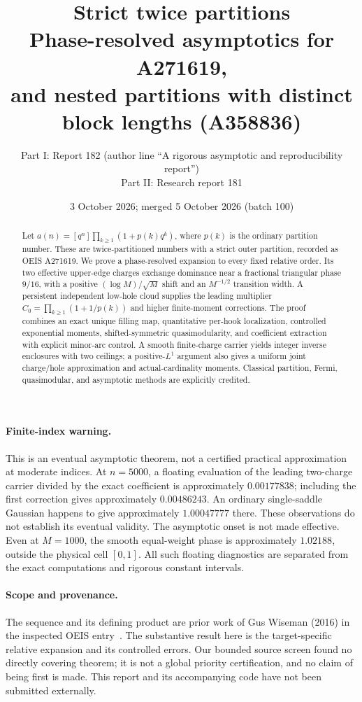 \documentclass[11pt]{article}
\title{Strict twice partitions\\[5pt]\large Phase-resolved asymptotics for A271619,\\ and nested partitions with distinct block lengths (A358836)}
\author{Part I: Report 182 (author line ``A rigorous asymptotic and reproducibility report'')\\
Part II: Research report 181}
\date{3 October 2026; merged 5 October 2026 (batch 100)}
\theoremstyle{remark}\newtheorem{remark}[theorem]{Remark}
\begin{document}
\maketitle
\begin{abstract}
Let $a(n)=[q^n]\prod_{k\ge1}(1+p(k)q^k)$, where $p(k)$ is the ordinary partition number. These are twice-partitioned numbers with a strict outer partition, recorded as OEIS A271619. We prove a phase-resolved expansion to every fixed relative order. Its two effective upper-edge charges exchange dominance near a fractional triangular phase $9/16$, with a positive $(\log M)/\sqrt M$ shift and an $M^{-1/2}$ transition width. A persistent independent low-hole cloud supplies the leading multiplier $C_0=\prod_{k\ge1}(1+1/p(k))$ and higher finite-moment corrections. The proof combines an exact unique filling map, quantitative per-hook localization, controlled exponential moments, shifted-symmetric quasimodularity, and coefficient extraction with explicit minor-arc control. A smooth finite-charge carrier yields integer inverse enclosures with two ceilings; a positive-$L^1$ argument also gives a uniform joint charge/hole approximation and actual-cardinality moments. Classical partition, Fermi, quasimodular, and asymptotic methods are explicitly credited.
\end{abstract}

\paragraph{Finite-index warning.}
This is an eventual asymptotic theorem, not a certified practical approximation at moderate indices. At $n=5000$, a floating evaluation of the leading two-charge carrier divided by the exact coefficient is approximately $0.00177838$; including the first correction gives approximately $0.00486243$. An ordinary single-saddle Gaussian happens to give approximately $1.00047777$ there. These observations do not establish its eventual validity. The asymptotic onset is not made effective. Even at $M=1000$, the smooth equal-weight phase is approximately $1.02188$, outside the physical cell $[0,1]$. All such floating diagnostics are separated from the exact computations and rigorous constant intervals.

\paragraph{Scope and provenance.}
The sequence and its defining product are prior work of Gus Wiseman (2016) in the inspected OEIS entry~\cite{oeis}. The substantive result here is the target-specific relative expansion and its controlled errors. Our bounded source screen found no directly covering theorem; it is not a global priority certification, and no claim of being first is made. This report and its accompanying code have not been submitted externally.
\end{document}
